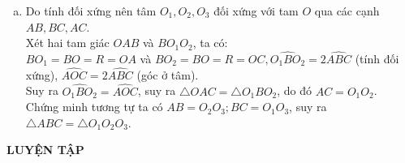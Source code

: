 \begin{vd}
{\begin{enumerate}[a)]
\begin{center}
\end{center}
\item Do tính đối xứng nên tâm $O_1,O_2,O_3$ đối xứng với tam $O$ qua các cạnh $AB, BC, AC$.\\
Xét hai tam giác $OAB$ và $BO_1O_2$, ta có:\\
$BO_1=BO=R=OA$ và $BO_2=BO=R=OC,\widehat{O_1BO_2}=2\widehat{ABC}$ (tính đối xứng), $\widehat{AOC}=2\widehat{ABC}$ (góc ở tâm).\\
Suy ra $\widehat{O_1BO_2}=\widehat{AOC}$, suy ra $\triangle OAC=\triangle O_1BO_2$, do đó $AC=O_1O_2$.\\
Chứng minh tương tự ta có $AB=O_2O_3; BC=O_1O_3$, suy ra $\triangle ABC=\triangle O_1O_2O_3$.
\end{enumerate}
}
\end{vd}
    
\begin{center}
    \textbf{LUYỆN TẬP}
\end{center}

